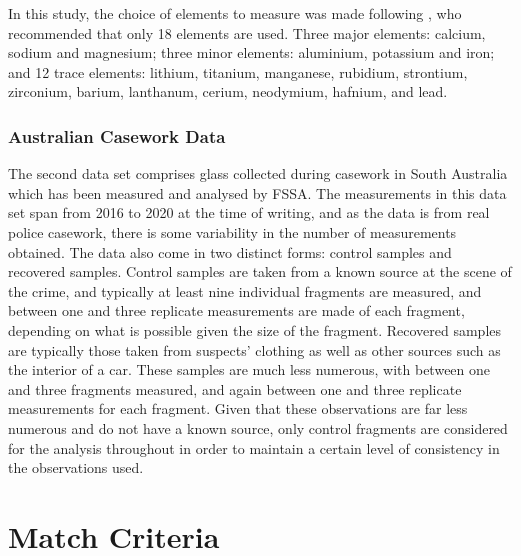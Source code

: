 \documentclass[a4paper]{article}
\begin{document}
In this study, the choice of elements to measure was made following \citet{Weis2011}, who recommended that only 18 elements are used. Three major elements: calcium, sodium and magnesium; three minor elements: aluminium, potassium and iron; and 12 trace elements: lithium, titanium, manganese, rubidium, strontium, zirconium, barium, lanthanum, cerium, neodymium, hafnium, and lead.

\subsubsection*{Australian Casework Data}

The second data set comprises glass collected during casework in South Australia which has been measured and analysed by FSSA. The measurements in this data set span from 2016 to 2020 at the time of writing, and as the data is from real police casework, there is some variability in the number of measurements obtained. The data also come in two distinct forms: control samples and recovered samples. Control samples are taken from a known source at the scene of the crime, and typically at least nine individual fragments are measured, and between one and three replicate measurements are made of each fragment, depending on what is possible given the size of the fragment. Recovered samples are typically those taken from suspects' clothing as well as other sources such as the interior of a car. These samples are much less numerous, with between one and three fragments measured, and again between one and three replicate measurements for each fragment. Given that these observations are far less numerous and do not have a known source, only control fragments are considered for the analysis throughout in order to maintain a certain level of consistency in the observations used.


\section{Match Criteria}
\end{document}

